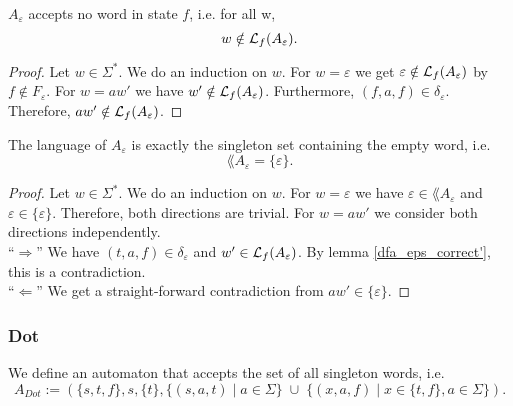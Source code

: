 \begin{lemma}
    \label{dfa_eps_correct'}
    $A_\varepsilon$ accepts no word in state $f$, i.e. for all w,
    \begin{equation*}
        w \notin \mathcal{L}_{f}(A_\varepsilon).
    \end{equation*}
\end{lemma}
\begin{proof}
    Let $w \in \Sigma^*$.
    We do an induction on $w$. 
    For $w = \varepsilon$ we get $\varepsilon \notin \mathcal{L}_{f}(A_\varepsilon)$ by $f \notin F_\varepsilon$. 
    For $w = aw'$ we have $w' \notin \mathcal{L}_{f}(A_\varepsilon)$. 
    Furthermore, $(f, a, f) \in \delta_\varepsilon$.
    Therefore, $aw' \notin \mathcal{L}_{f}(A_\varepsilon)$.
\end{proof}

\begin{lemma}
    \label{dfa_eps_correct}
    The language of $A_\varepsilon$ is exactly the singleton set containing the empty word, i.e.
    \begin{equation*}
        \lang{A_\varepsilon} = \{\varepsilon\}.
    \end{equation*}
\end{lemma}

\begin{proof}
    Let $w \in \Sigma^*$.
    We do an induction on $w$. 
    For $w = \varepsilon$ we have $\varepsilon \in \lang{A_\varepsilon}$ and $\varepsilon \in \{\varepsilon\}$.
    Therefore, both directions are trivial.
    For $w = aw'$ we consider both directions independently. \\
    ``$\Rightarrow$'' We have $(t, a, f) \in \delta_\varepsilon$ and $w' \in \mathcal{L}_{f}(A_\varepsilon)$. By lemma \ref{dfa_eps_correct'}, this is a contradiction. \\
    ``$\Leftarrow$'' We get a straight-forward contradiction from $aw' \in \{\varepsilon\}$.
\end{proof}



\subsubsection{Dot}
\begin{definition}
    We define an automaton that accepts the set of all singleton words, i.e.
    \begin{equation*}
        A_{Dot} := (\{s, t, f\}, s, \{t\}, 
        \{(s, a, t) \; | \; a \in \Sigma\}
        \; \cup \;
        \{(x, a, f) \; | \; x \in \{t, f\}, a \in \Sigma\}
        ).
    \end{equation*}
\end{definition}

